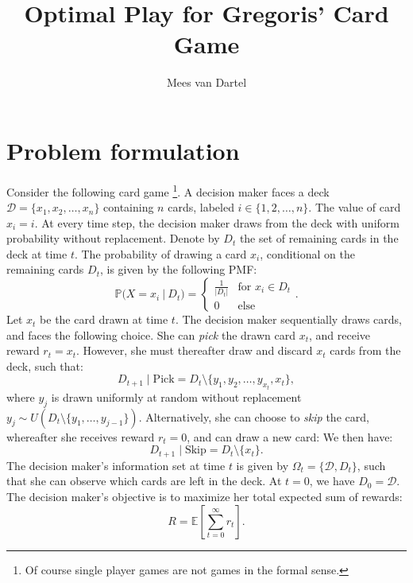 \documentclass{article}
\title{Optimal Play for Gregoris' Card Game}
\author{Mees van Dartel}
\begin{document}
\maketitle
\section{Problem formulation}
Consider the following card game \footnote{Of course single player games are not games in the formal sense.}. A decision maker faces a deck $\mathcal{D} = \{x_1, x_2, \dots, x_n\}$ containing $n$ cards, labeled $i \in \{1, 2, \dots, n\}$.
The value of card $x_i=i$. At every time step, the decision maker draws from the deck with uniform probability without replacement.
Denote by $D_t$ the set of remaining cards in the deck at time $t$. The probability of drawing a card $x_i$, conditional on the remaining cards $D_t$, is given by the following PMF:
\begin{equation}
    \mathbb{P}\Big(X=x_i \ \big| \  D_t\Big) =\begin{cases}
        \frac{1}{|D_t|} & \text{for } x_i \in D_t \\
        0               & \text{else}
    \end{cases}.
\end{equation}
Let $x_t$ be the card drawn at time $t$.
The decision maker sequentially draws cards, and faces the following choice. She can \textit{pick} the drawn card $x_t$, and receive reward $r_t=x_t$. However, she must thereafter draw and discard $x_t$ cards from the deck, such that:
\begin{equation}
    D_{t+1} \mid \text{Pick} = D_{t}  \setminus \{y_1, y_2, \ldots, y_{x_t}, x_t\},
\end{equation}
where $y_j$ is drawn uniformly at random without replacement $y_j \sim U(D_t \setminus \{y_1, \dots, y_{j-1}\})$. Alternatively, she can choose to \textit{skip} the card, whereafter she receives reward $r_t=0$, and can draw a new card:
We then have:
\begin{equation}
    D_{t+1} \mid \text{Skip} = D_{t} \setminus \{x_t\}.
\end{equation}
The decision maker's information set at time $t$ is given by $\Omega_t = \{\mathcal{D}, D_t\}$, such that she can observe which cards are left in the deck. At $t=0$, we have $ D_0 = \mathcal{D}$. The decision maker's objective is to maximize her total expected sum of rewards:
\begin{equation}
    R=\mathbb{E}\left[\sum_{t=0}^\infty r_t\right].
\end{equation}
\end{document}
